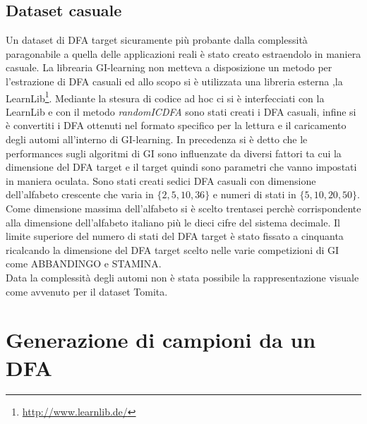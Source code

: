 \subsection{Dataset casuale}
Un dataset di \ac{DFA} target sicuramente più probante dalla complessità paragonabile a quella delle applicazioni reali è stato creato estraendolo in maniera casuale. La librearia GI-learning non metteva a disposizione un metodo per l'estrazione di \ac{DFA} casuali ed allo scopo si è utilizzata una libreria esterna ,la LearnLib\footnote{\href{http://www.learnlib.de/}{http://www.learnlib.de/}}. Mediante la stesura di codice ad hoc ci si è interfecciati con la LearnLib e con il metodo \textit{randomICDFA} sono stati creati i \ac{DFA} casuali, infine si è convertiti i \ac{DFA} ottenuti nel formato specifico per la lettura e il caricamento degli automi all'interno di GI-learning. 
In precedenza si è detto che le performances sugli algoritmi di  \ac{GI} sono influenzate da diversi fattori ta cui la dimensione del \ac{DFA} target e il target quindi sono parametri che vanno impostati in maniera oculata.
Sono stati creati sedici \ac{DFA} casuali con dimensione dell'alfabeto crescente che varia in $\{2,5,10,36\}$ e numeri di stati in $\{5,10,20,50\}$. Come dimensione massima dell'alfabeto si è scelto trentasei perchè corrispondente alla dimensione dell'alfabeto italiano più le dieci cifre del sistema decimale. Il limite superiore del numero di stati del \ac{DFA} target è stato fissato a cinquanta ricalcando la dimensione del \ac{DFA} target scelto   nelle varie competizioni di \ac{GI} come ABBANDINGO e STAMINA.\\
Data la complessità degli automi non è stata possibile la rappresentazione visuale come avvenuto per il dataset Tomita.


\section[Gen. campioni da DFA]{Generazione di campioni da un DFA}
\label{sec:gensam}

